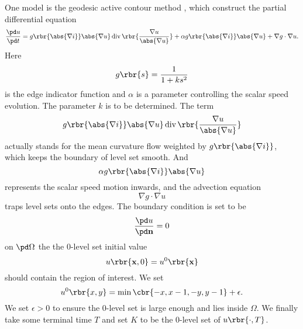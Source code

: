 \documentclass[english, nochinese]{pnote}
\DeclareMathOperator\opdiv{\mathrm{div}}
\begin{document}
One model is the geodesic active contour method \parencite{zhao_variational_1996}, which construct the partial differential equation
\begin{equation} \label{Eq:PDE}
\frac{ \pd u }{ \pd t } = g \rbr{\abs{ \nabla i }} \abs{ \nabla u } \opdiv \rbr{\frac{ \nabla u }{\abs{ \nabla u }}} + \alpha g \rbr{\abs{ \nabla i }} \abs{ \nabla u } + \nabla g \cdot \nabla u.
\end{equation}
Here
\begin{equation}
g \rbr{s} = \frac{1}{ 1 + k s^2 }
\end{equation}
is the edge indicator function and $\alpha$ is a parameter controlling the scalar speed evolution. The parameter $k$ is to be determined. The term
\begin{equation} \label{Eq:Part1}
g \rbr{\abs{ \nabla i }} \abs{ \nabla u } \opdiv \rbr{\frac{ \nabla u }{\abs{ \nabla u }}}
\end{equation}
actually stands for the mean curvature flow weighted by $ g \rbr{\abs{ \nabla i }} $, which keeps the boundary of level set smooth. And
\begin{equation} \label{Eq:Part2}
\alpha g \rbr{\abs{ \nabla i }} \abs{ \nabla u }
\end{equation}
represents the scalar speed motion inwards, and the advection equation
\begin{equation} \label{Eq:Part3}
\nabla g \cdot \nabla u
\end{equation}
traps level sets onto the edges. The boundary condition is set to be
\begin{equation}
\frac{ \pd u }{ \pd \mathbf{n} } = 0
\end{equation}
on $ \pd \Omega $ the the $0$-level set initial value
\begin{equation}
u \rbr{ \mathbf{x}, 0 } = u^0 \rbr{\mathbf{x}}
\end{equation}
should contain the region of interest. We set
\begin{equation}
u^0 \rbr{ x, y } = \min \cbr{ -x, x - 1, -y, y - 1 } + \epsilon.
\end{equation}
We set $ \epsilon > 0 $ to ensure the $0$-level set is large enough and lies inside $\Omega$. We finally take some terminal time $T$ and set $K$ to be the $0$-level set of $ u \rbr{ \cdot, T } $.
\end{document}
